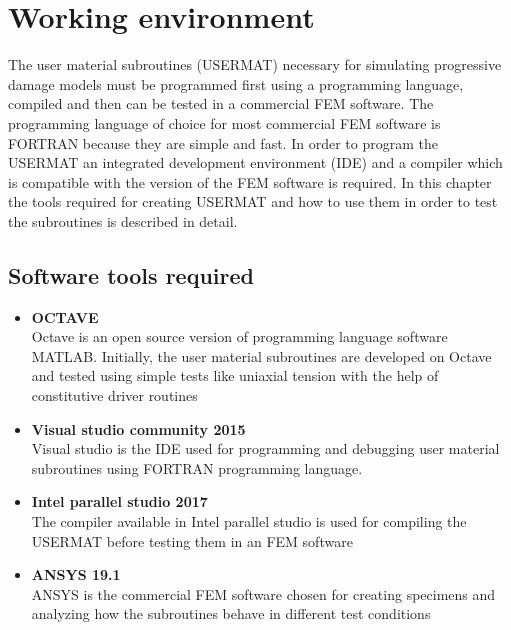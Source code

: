 \documentclass[a4paper,12pt]{extarticle}
\begin{document}
\newpage
\vspace*{2cm}
\section{Working environment}
\vspace*{1cm}
\indent\indent\indent  The user material subroutines (USERMAT) necessary for simulating progressive damage models must be programmed first using a programming language, compiled and then can be tested in a commercial FEM software. The programming language of choice for most commercial FEM software is FORTRAN because they are simple and fast. In order to program the USERMAT an integrated development environment (IDE) and a compiler which is compatible with the version of the FEM software is required. In this chapter the tools required for creating USERMAT and how to use them in order to test the subroutines is described in detail.  
\vspace*{1cm}
\subsection{Software tools required}
\begin{itemize}
\item \textbf{OCTAVE}\\ \indent
\hspace*{13mm} Octave is an open source version of programming language software MATLAB. Initially, the user material subroutines are developed on Octave and tested using simple tests like uniaxial tension with the help of constitutive driver routines
\item \textbf{Visual studio community 2015}\\
\hspace*{13mm} Visual studio is the IDE used for programming and debugging user material subroutines using FORTRAN programming language.
\item \textbf{Intel parallel studio 2017}\\
\hspace*{13mm} The compiler available in Intel parallel studio is used for compiling the USERMAT before testing them in an FEM software
\item \textbf{ANSYS 19.1}\\
\hspace*{13mm}ANSYS is the commercial FEM software chosen for creating specimens and analyzing how the subroutines behave in different test conditions
\end{itemize}
\end{document}
